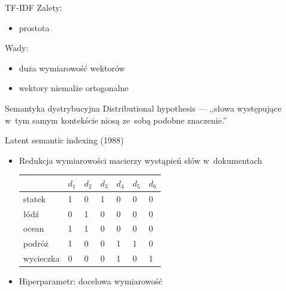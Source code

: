 \documentclass{beamer}
\begin{document}
	\begin{frame}{TF-IDF}
		Zalety:
		\begin{itemize}
			\item prostota \pause
		\end{itemize}
		Wady:
		\begin{itemize}
			\item duża wymiarowość wektorów \pause
			\item wektory niemalże ortogonalne
		\end{itemize}
	\end{frame}
	\begin{frame}{Semantyka dystrybucyjna}
		Distributional hypothesis --- ,,słowa występujące w~tym samym kontekście niosą ze~sobą podobne znaczenie.''
	\end{frame}
	\begin{frame}{Latent semantic indexing (1988)}
		\begin{itemize}
			\item Redukcja wymiarowości macierzy wystąpień słów w~dokumentach
			\begin{center}
				\begin{tabular}{ | l | l | l | l | l | l | l |}
					\hline
					 & $d_1$ & $d_2$ & $d_3$ & $d_4$  & $d_5$  & $d_6$ \\ \hline
					statek & 1 & 0 & 1 & 0 & 0 & 0 \\ \hline
					łódź & 0 & 1 & 0 & 0 & 0 & 0 \\ \hline
					ocean & 1 & 1 & 0 & 0 & 0 & 0 \\ \hline
					podróż & 1 & 0 & 0 & 1 & 1 & 0 \\ \hline
					wycieczka & 0 & 0 & 0 & 1 & 0 & 1 \\
					\hline
				\end{tabular}
			\end{center}
			\item Hiperparametr: docelowa wymiarowość
		\end{itemize}
	\end{frame}
\end{document}
